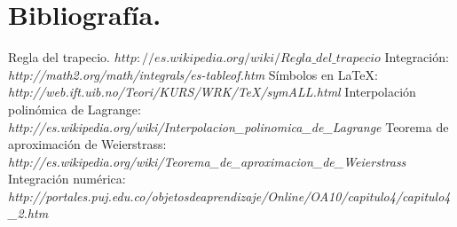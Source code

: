 \documentclass{beamer}
\begin{document}
  \section{Bibliografía.}
  \begin{thebibliography}{00}
      Regla del trapecio. $http://es.wikipedia.org/wiki/Regla\_del\_trapecio$
      Integración:\\ \emph{http://math2.org/math/integrals/es-tableof.htm}
    \bibitem{}
      Símbolos en \LaTeX:\\ \emph{http://web.ift.uib.no/Teori/KURS/WRK/TeX/symALL.html}
      Interpolación polinómica de Lagrange:\\ \emph{http://es.wikipedia.org/wiki/Interpolacion\_polinomica\_de\_Lagrange}
      Teorema de aproximación de Weierstrass:\\ \emph{http://es.wikipedia.org/wiki/Teorema\_de\_aproximacion\_de\_Weierstrass}
      Integración numérica:\\ \emph{http://portales.puj.edu.co/objetosdeaprendizaje/Online/OA10/capitulo4/capitulo4\_2.htm}
  \end{thebibliography}

\end{document}

